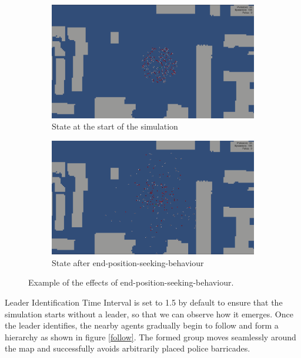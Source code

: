 \documentclass[9pt]{pnas-new}
\begin{document}
\begin{figure}[H]
\centering
\begin{subfigure}{.5\textwidth}
  \centering
  \includegraphics[width=0.95\columnwidth]{before.png}
  \caption{State at the start of the simulation}
  \label{fig:sub1}
\end{subfigure}%
\begin{subfigure}{.5\textwidth}
  \centering
  \includegraphics[width=0.95\columnwidth]{after.png}
  \caption{State after end-position-seeking-behaviour}
  \label{fig:sub2}
\end{subfigure}
\caption{Example of the effects of end-position-seeking-behaviour.}
\label{fig3}
\end{figure}

Leader Identification Time Interval is set to 1.5 by default to ensure that the simulation starts without a leader, so that we can observe how it emerges. Once the leader identifies, the nearby agents gradually begin to follow and form a hierarchy as shown in figure \ref{follow}. The formed group moves seamlessly around the map and successfully avoids arbitrarily placed police barricades. 
\end{document}
